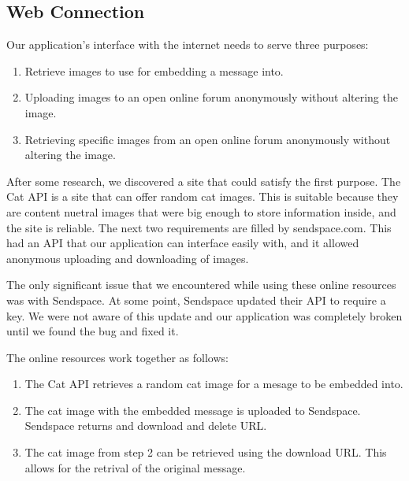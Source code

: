 \subsection{Web Connection}

Our application's interface with the internet needs to serve three purposes:
\begin{enumerate}
\item Retrieve images to use for embedding a message into. 
\item Uploading images to an open online forum anonymously without altering the image.
\item Retrieving specific images from an open online forum anonymously without altering the image. 
\end{enumerate}

After some research, we discovered a site that could satisfy the first purpose. The Cat API is a site that can offer random cat images. This is suitable because they are content nuetral images that were big enough to store information inside, and the site is reliable. The next two requirements are filled by sendspace.com. This had an API that our application can interface easily with, and it allowed anonymous uploading and downloading of images. 

The only significant issue that we encountered while using these online resources was with Sendspace. At some point, Sendspace updated their API to require a key. We were not aware of this update and our application was completely broken until we found the bug and fixed it.

The online resources work together as follows:
\begin{enumerate}
\item The Cat API retrieves a random cat image for a mesage to be embedded into.
\item The cat image with the embedded message is uploaded to Sendspace. Sendspace returns and download and delete URL.
\item The cat image from step 2 can be retrieved using the download URL. This allows for the retrival of the original message. 
\end{enumerate}











